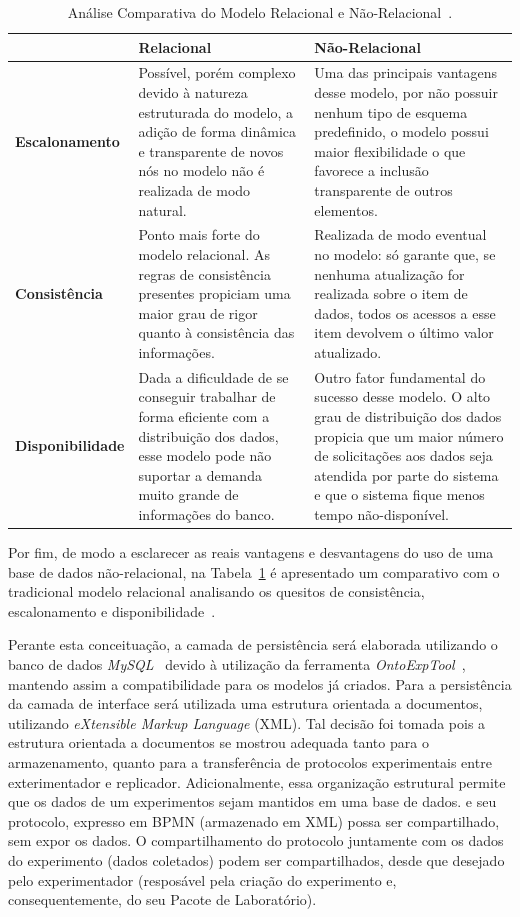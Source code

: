 \begin{table}[!bth]
\label{comparativo}
\centering
\caption{Análise Comparativa do Modelo Relacional e Não-Relacional~\cite{brito2010bancos}.}
\begin{tabular}{l|p{5.7cm}|p{5.7cm}}
\hline
 & \textbf{Relacional} & \textbf{Não-Relacional} \\ 
\hline                               
\textbf{Escalonamento} & Possível, porém complexo devido à natureza estruturada do modelo, a adição de forma dinâmica e transparente de novos nós no modelo não é realizada de modo natural. & Uma das principais vantagens desse modelo, por não possuir nenhum tipo de esquema predefinido, o modelo possui maior flexibilidade o que favorece a inclusão transparente de outros elementos.\\
\hline
\textbf{Consistência} & Ponto mais forte do modelo relacional. As regras de consistência presentes propiciam uma maior grau de rigor quanto à consistência das informações. & Realizada de modo eventual no modelo: só garante que, se nenhuma atualização for realizada sobre o item de dados, todos os acessos a esse item devolvem o último valor atualizado. \\
\hline
\textbf{Disponibilidade} & Dada a dificuldade de se conseguir trabalhar de forma eficiente com a distribuição dos dados, esse modelo pode não suportar a demanda muito grande de informações do banco. & Outro fator fundamental do sucesso desse modelo. O alto grau de distribuição dos dados propicia que um maior número de solicitações aos dados seja atendida por parte do sistema e que o sistema fique menos tempo não-disponível. \\
\hline
\end{tabular}
\normalsize
\end{table}

Por fim, de modo a esclarecer as reais vantagens e desvantagens do uso de uma base de dados não-relacional, na Tabela~\ref{comparativo} é apresentado um comparativo com o tradicional modelo relacional analisando os quesitos de consistência, escalonamento e disponibilidade~\cite{brito2010bancos}.

Perante esta conceituação, a camada de persistência será elaborada utilizando o banco de dados \textit{MySQL}~\cite{mysql2001mysql} devido à utilização da ferramenta \textit{OntoExpTool}~\cite{Pucci2014}, mantendo assim a compatibilidade para os modelos já criados. Para a persistência da camada de interface será utilizada uma estrutura orientada a documentos, utilizando \textit{eXtensible Markup Language} (XML). Tal decisão foi tomada pois a estrutura orientada a documentos  se mostrou adequada tanto para o armazenamento, quanto para a transferência de protocolos experimentais entre exterimentador e replicador. Adicionalmente, essa organização estrutural permite que os dados de um experimentos sejam mantidos em uma base de dados. e seu protocolo, expresso em BPMN (armazenado em XML) possa ser compartilhado, sem expor os dados. O compartilhamento do protocolo juntamente com os dados do experimento (dados coletados) podem ser compartilhados, desde que desejado pelo experimentador (resposável pela criação do experimento e, consequentemente, do seu Pacote de Laboratório).

